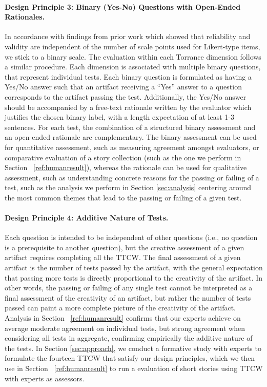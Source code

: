 \paragraph{Design Principle 3: Binary (Yes-No) Questions with Open-Ended Rationales.} In accordance with findings from prior work \cite{doi:10.1177/001316447103100307} which showed that reliability and validity are independent of the number of scale points
used for Likert-type items, we stick to a binary scale. The evaluation within each Torrance dimension follows a similar procedure. Each dimension is associated with multiple binary questions, that represent individual tests. Each binary question is formulated as having a Yes/No answer such that an artifact receiving a ``Yes'' answer to a question corresponds to the artifact passing the test. Additionally, the Yes/No answer should be accompanied by a free-text rationale written by the evaluator which justifies the chosen binary label, with a length expectation of at least 1-3 sentences. For each test, the combination of a structured binary assessment and an open-ended rationale are complementary. The binary assessment can be used for quantitative assessment, such as measuring agreement amongst evaluators, or comparative evaluation of a story collection (such as the one we perform in Section ~\ref{ref:humanresult}), whereas the rationale can be used for qualitative assessment, such as understanding concrete reasons for the passing or failing of a test, such as the analysis we perform in Section \ref{sec:analysis} centering around the most common themes that lead to the passing or failing of a given test.
\paragraph{Design Principle 4: Additive Nature of Tests.} Each question is intended to be independent of other questions (i.e., no question is a prerequisite to another question), but the creative assessment of a given artifact requires completing all the TTCW. 
The final assessment of a given artifact is the number of tests passed by the artifact, with the general expectation that passing more tests is directly proportional to the creativity of the artifact. In other words, the passing or failing of any single test cannot be interpreted as a final assessment of the creativity of an artifact, but rather the number of tests passed can paint a more complete picture of the creativity of the artifact. Analysis in Section ~\ref{ref:humanresult} confirms that our experts achieve on average moderate agreement on individual tests, but strong agreement when considering all tests in aggregate, confirming empirically the additive nature of the tests. In Section \ref{sec:approach}, we conduct a formative study with experts to formulate the fourteen TTCW that satisfy our design principles, which we then use in Section ~\ref{ref:humanresult} to run a evaluation of short stories using TTCW with experts as assessors. 

